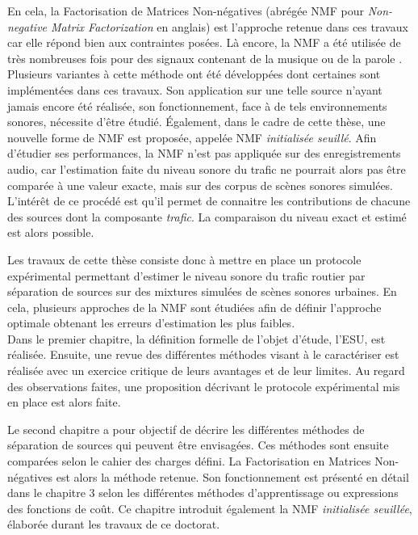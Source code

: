 En cela, la Factorisation de Matrices Non-négatives (abrégée NMF pour \textit{Non-negative Matrix Factorization} en anglais) \cite{lee_learning_1999} est l'approche retenue dans ces travaux car elle répond bien aux contraintes posées. Là encore, la NMF a été utilisée de très nombreuses fois pour des signaux contenant de la musique \cite{helen2005separation,fevotte_nonnegative_2009} ou de la parole \cite{wilson2008speech,schmidt2006single}. Plusieurs variantes à cette méthode ont été développées dont certaines sont implémentées dans ces travaux. Son application sur une telle source n'ayant jamais encore été réalisée, son fonctionnement, face à de tels environnements sonores,  nécessite d'être étudié. Également, dans le cadre de cette thèse, une nouvelle forme de NMF est proposée, appelée NMF \textit{initialisée seuillé}. 
Afin d'étudier ses performances, la NMF n'est pas appliquée sur des enregistrements audio, car l'estimation faite du niveau sonore du trafic ne pourrait alors pas être comparée à une valeur exacte, mais sur des corpus de scènes sonores simulées. L'intérêt de ce procédé est qu'il permet de connaitre les contributions de chacune des sources dont la composante \textit{trafic}. La comparaison du niveau exact et estimé est alors possible.

Les travaux de cette thèse consiste donc à mettre en place un protocole expérimental permettant d'estimer le niveau sonore du trafic routier par séparation de sources sur des mixtures simulées de scènes sonores urbaines. En cela, plusieurs approches de la NMF sont étudiées afin de définir l'approche optimale obtenant les erreurs d'estimation les plus faibles.\\


Dans le premier chapitre, la définition formelle de l'objet d'étude, l'ESU, est réalisée. Ensuite, une revue des différentes méthodes visant à le caractériser est réalisée avec un exercice critique de leurs avantages et de leur limites. Au regard des observations faites, une proposition décrivant le protocole expérimental mis en place est alors faite.

Le second chapitre a pour objectif de décrire les différentes méthodes de séparation de sources qui peuvent être envisagées. Ces méthodes sont ensuite comparées selon le cahier des charges défini. La Factorisation en Matrices Non-négatives est alors la méthode retenue. 
Son fonctionnement est présenté en détail dans le chapitre 3 selon les différentes méthodes d'apprentissage ou expressions des fonctions de coût. Ce chapitre introduit également la NMF \textit{initialisée seuillée}, élaborée durant les travaux de ce doctorat. 


